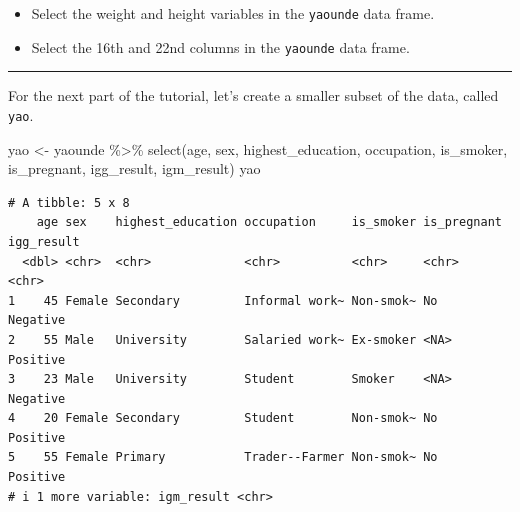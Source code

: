 \documentclass[
  letterpaper,
  DIV=11,
  numbers=noendperiod]{scrreprt}
\newenvironment{Shaded}{\begin{snugshade}}{\end{snugshade}}
\newcommand{\FunctionTok}[1]{\textcolor[rgb]{0.28,0.35,0.67}{#1}}
\newcommand{\NormalTok}[1]{\textcolor[rgb]{0.00,0.23,0.31}{#1}}
\newcommand{\OtherTok}[1]{\textcolor[rgb]{0.00,0.23,0.31}{#1}}
\newcommand{\SpecialCharTok}[1]{\textcolor[rgb]{0.37,0.37,0.37}{#1}}
\providecommand{\tightlist}{%
  \setlength{\itemsep}{0pt}\setlength{\parskip}{0pt}}\usepackage{longtable,booktabs,array}
\begin{document}
\begin{tcolorbox}[enhanced jigsaw, colframe=quarto-callout-tip-color-frame, rightrule=.15mm, opacityback=0, breakable, coltitle=black, colbacktitle=quarto-callout-tip-color!10!white, bottomrule=.15mm, leftrule=.75mm, toprule=.15mm, arc=.35mm, bottomtitle=1mm, colback=white, left=2mm, opacitybacktitle=0.6, titlerule=0mm, title=\textcolor{quarto-callout-tip-color}{\faLightbulb}\hspace{0.5em}{Practice}, toptitle=1mm]

\begin{itemize}
\tightlist
\item
  Select the weight and height variables in the \texttt{yaounde} data
  frame.
\end{itemize}

\begin{itemize}
\tightlist
\item
  Select the 16th and 22nd columns in the \texttt{yaounde} data frame.
\end{itemize}

\end{tcolorbox}

\begin{center}\rule{0.5\linewidth}{0.5pt}\end{center}

For the next part of the tutorial, let's create a smaller subset of the
data, called \texttt{yao}.

\begin{Shaded}
\begin{Highlighting}[]
\NormalTok{yao }\OtherTok{\textless{}{-}}
\NormalTok{  yaounde }\SpecialCharTok{\%\textgreater{}\%} \FunctionTok{select}\NormalTok{(age,}
\NormalTok{                     sex,}
\NormalTok{                     highest\_education,}
\NormalTok{                     occupation,}
\NormalTok{                     is\_smoker,}
\NormalTok{                     is\_pregnant,}
\NormalTok{                     igg\_result,}
\NormalTok{                     igm\_result)}
\NormalTok{yao}
\end{Highlighting}
\end{Shaded}

\begin{verbatim}
# A tibble: 5 x 8
    age sex    highest_education occupation     is_smoker is_pregnant igg_result
  <dbl> <chr>  <chr>             <chr>          <chr>     <chr>       <chr>     
1    45 Female Secondary         Informal work~ Non-smok~ No          Negative  
2    55 Male   University        Salaried work~ Ex-smoker <NA>        Positive  
3    23 Male   University        Student        Smoker    <NA>        Negative  
4    20 Female Secondary         Student        Non-smok~ No          Positive  
5    55 Female Primary           Trader--Farmer Non-smok~ No          Positive  
# i 1 more variable: igm_result <chr>
\end{verbatim}
\end{document}
